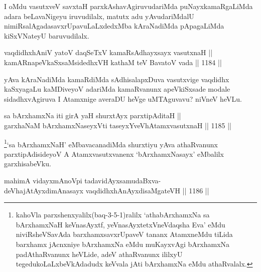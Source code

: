 \begin{artha}
I oMdu vasutxveV savxtaH parxkAshavAgiruvudariMda puNayxkamaRgaLiMda adara beLavaNigeyu iruvudilalx, matutx adu yAvudariMdalU nimiRsalAgadasavxrUpavuLaLxdedxMba kAraNadiMda pApagaLiMda kiSxVNateyU baruvudilalx.
\end{artha}


\begin{shl}
vaqdidhxhAniV yatoV daqSeTxV kamaRsAdhayxsayx vasutxnaH || \\
kamARnapeVkaSxsaMsidedhxVH kathaM teV BavatoV vada \hfill || 1184 ||  
\end{shl}

\begin{artha}
yAva kAraNadiMda kamaRdiMda sAdhisalapxDuva vasutxvige vaqdidhx kaSxyagaLu kaMDiveyoV adariMda kamaRvanunx apeVkiSxsade modale sidadhxvAgiruva I Atamxnige averaDU heVge uMTAguvavu? niVneV heVLu.
\end{artha}


\begin{shl}
sa bArxhamxNa iti girA yaH shurxtAyx parxtipAditaH || \\
garxhaNaM bArxhamxNaseyxVti taseyxYveVhA\s \s tamxvasutxnaH \hfill || 1185 ||  
\end{shl}

\begin{artha}
\footnote{kahoVla parxshenxyalilx(baq-3-5-1)ralilx `athabArxhamxNa sa bArxhamxNaH keVnasAyxtf, yeVnasAyxtetxVneVdaqsha Eva' eMdu niviRsheVSavAda barxhamxsavxrUpaveV tananx AtamxneMdu tiLida barxhamx jAcnxniye bArxhamxNa eMdu muKayxvAgi bArxhamxNa padAthaRvanunx heVLide, adeV athaRvanunx ililxyU tegedukoLaLxbeVkAdadudx keVvala jAti bArxhamxNa eMdu athaRvalalx.}`sa bArxhamxNaH' eMbavacanadiMda shurxtiyu yAva athaRvanunx parxtipAdisideyoV A Atamxvasutxvanenx `bArxhamxNasayx' eMbalilx garxhisabeVku.
\end{artha}



\begin{shl}
mahimA vidayxmAnoV\s pi tadavidAyxsamudaBxva- \\
deVhajAtAyxdimAnasayx vaqdidhxhAnAyxdisaMgateVH \hfill || 1186 ||  
\end{shl}
				
